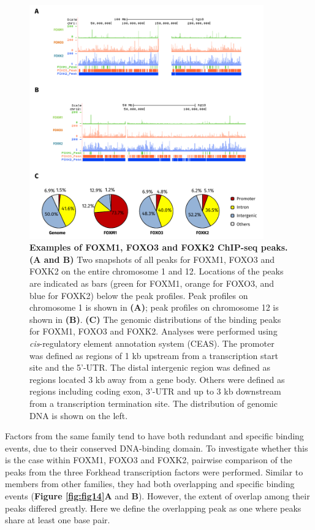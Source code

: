 \begin{figure}[!h]
    \centering
    \includegraphics[width=0.9\textwidth]{chapter3/figures_overview/fig13.pdf}
    \caption[Examples of FOXM1, FOXO3 and FOXK2 ChIP-seq peaks]{\textbf{Examples of FOXM1, FOXO3 and FOXK2 ChIP-seq peaks. (A and B)} Two snapshots of all peaks for FOXM1, FOXO3 and FOXK2 on the entire chromosome 1 and 12. Locations of the peaks are indicated as bars (green for FOXM1, orange for FOXO3, and blue for FOXK2) below the peak profiles. Peak profiles on chromosome 1 is shown in \textbf{(A)}; peak profiles on chromosome 12 is shown in \textbf{(B)}. \textbf{(C)} The genomic distributions of the binding peaks for FOXM1, FOXO3 and FOXK2. Analyses were performed using \textit{cis}-regulatory element annotation system (CEAS). The promoter was defined as regions of 1 kb upstream from a transcription start site and the 5'-UTR. The distal intergenic region was defined as regions located 3 kb away from a gene body. Others were defined as regions including coding exon, 3'-UTR and up to 3 kb downstream from a transcription termination site. The distribution of genomic DNA is shown on the left.}
    \label{fig:fig13}
\end{figure}

Factors from the same family tend to have both redundant and specific binding events, due to their conserved DNA-binding domain. To investigate whether this is the case within FOXM1, FOXO3 and FOXK2, pairwise comparison of the peaks from the three Forkhead transcription factors were performed. Similar to members from other families, they had both overlapping and specific binding events (\textbf{Figure \ref{fig:fig14}A} and \textbf{B}). However, the extent of overlap among their peaks differed greatly. Here we define the overlapping peak as one where peaks share at least one base pair.

